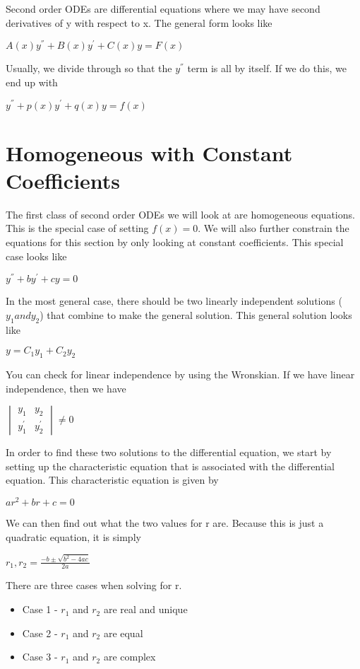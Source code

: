 \documentclass[
  letterpaper,
]{report}
\begin{document}
Second order ODEs are differential equations where we may have second
derivatives of y with respect to x. The general form looks like

\(A(x) y^{''} + B(x) y^{'} + C(x) y = F(x)\)

Usually, we divide through so that the \(y^{''}\) term is all by itself.
If we do this, we end up with

\(y^{''} + p(x) y^{'} + q(x) y = f(x)\)

\section{Homogeneous with Constant
Coefficients}\label{homogeneous-with-constant-coefficients}

The first class of second order ODEs we will look at are homogeneous
equations. This is the special case of setting \(f(x) = 0\). We will
also further constrain the equations for this section by only looking at
constant coefficients. This special case looks like

\(y^{''} + b y^{'} + c y = 0\)

In the most general case, there should be two linearly independent
solutions (\(y_1 and y_2\)) that combine to make the general solution.
This general solution looks like

\(y = C_1 y_1 + C_2 y_2\)

You can check for linear independence by using the Wronskian. If we have
linear independence, then we have

\(\begin{vmatrix}
y_1 & y_2 \\
y^{'}_1 & y^{'}_2
\end{vmatrix} \ne 0\)

In order to find these two solutions to the differential equation, we
start by setting up the characteristic equation that is associated with
the differential equation. This characteristic equation is given by

\(a r^2 + b r + c = 0\)

We can then find out what the two values for r are. Because this is just
a quadratic equation, it is simply

\(r_1,r_2 = \frac{-b \pm \sqrt{b^2 - 4 a c}}{2 a}\)

There are three cases when solving for r.

\begin{itemize}
\item Case 1 - $r_1$ and $r_2$ are real and unique
\item Case 2 - $r_1$ and $r_2$ are equal
\item Case 3 - $r_1$ and $r_2$ are complex
\end{itemize}
\end{document}
